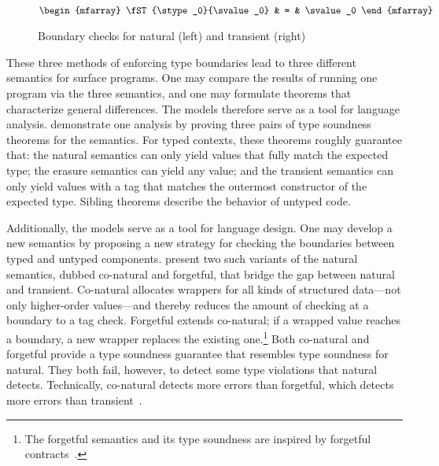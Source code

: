 \begin{figure}[ht]
\begin{minipage}[t]{0.5\columnwidth}
  \fbox{$\STsym : \tpair{\stype}{\svalue} \rightarrow \svalue \cup \serror$}\\
  \(\begin{mfarray}
    \fST{\stype_0}{\svalue_0}
    & = &
    \svalue_0
  \end{mfarray}\)
  \end{minipage}

  \caption{Boundary checks for natural (left) and transient (right)}
  \label{fig:nt-boundary}
\end{figure}

These three methods of enforcing type boundaries lead to three different
 semantics for surface programs.
One may compare the results of running one program via the three semantics,
 and one may formulate theorems that characterize general differences.
The models therefore serve as a tool for language analysis.
\citet{gf-icfp-2018} demonstrate one analysis by proving three pairs of type
 soundness theorems for the semantics.
For typed contexts, these theorems roughly guarantee that:
 the natural semantics can only yield values that fully match the expected type;
 the erasure semantics can yield any value;
 and the transient semantics can only yield values with a tag that matches
 the outermost constructor of the expected type.
Sibling theorems describe the behavior of untyped code.

Additionally, the models serve as a tool for language design.
One may develop a new semantics by proposing a new strategy for checking
 the boundaries between typed and untyped components.
\citet{gf-icfp-2018} present two such variants of the natural semantics,
 dubbed co-natural and forgetful,
 that bridge the gap between natural and transient.
Co-natural allocates wrappers for all kinds of structured data---not only
 higher-order values---and thereby reduces the amount of checking at a boundary
 to a tag check.
Forgetful extends co-natural; if a wrapped value reaches a boundary, a new
 wrapper replaces the existing one.\footnote{The forgetful semantics and its
  type soundness are inspired by forgetful contracts~\cite{g-popl-2015}.}
Both co-natural and forgetful provide a type soundness guarantee that resembles
 type soundness for natural.
They both fail, however, to detect some type violations that natural detects.
Technically, co-natural detects more errors than forgetful, which detects
 more errors than transient~\cite{gf-icfp-2018}.

%

